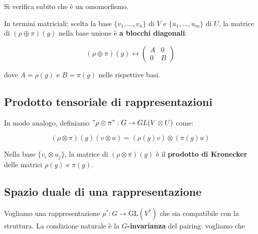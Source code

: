Si verifica subito che è un omomorfismo.

In termini matriciali: scelta la base $\{v_1, \ldots, v_n\}$ di $V$ e $\{u_1, \ldots, u_m\}$ di $U$, la matrice di $(\rho \oplus \pi)(g)$ nella base unione è \textbf{a blocchi diagonali}:

$$(\rho \oplus \pi)(g) \longleftrightarrow \begin{pmatrix} A & 0 \\ 0 & B \end{pmatrix}$$

dove $A = \rho(g)$ e $B = \pi(g)$ nelle rispettive basi.


\subsection{Prodotto tensoriale di rappresentazioni}
In modo analogo, definiamo $ "\rho \otimes \pi": G \to GL(V \otimes U) $ come:

$$(\rho \otimes \pi)(g)(v \otimes u) = (\rho(g)v) \otimes (\pi(g)u)$$

Nella base $\{v_i \otimes u_j\}$, la matrice di $(\rho \otimes \pi)(g)$ è il \textbf{prodotto di Kronecker} delle matrici $\rho(g)$ e $\pi(g)$.


\subsection{Spazio duale di una rappresentazione}
Vogliamo una rappresentazione $\rho^*: G \to \mathrm{GL}(V^*)$ che sia compatibile con la struttura. La condizione naturale è la \textbf{$G$-invarianza} del pairing: vogliamo che

